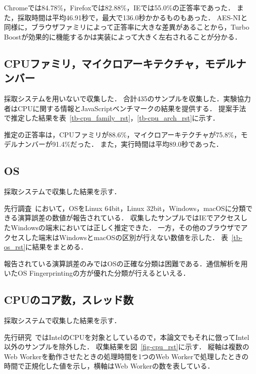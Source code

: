 Chromeでは84.78\%，Firefoxでは82.88\%，IEでは55.0\%の正答率であった．
また，採取時間は平均46.91秒で，最大で136.0秒かかるものもあった．
AES-NIと同様に，ブラウザファミリによって正答率に大きな差異があることから，Turbo Boostが効果的に機能するかは実装によって大きく左右されることが分かる．

\subsection{CPUファミリ，マイクロアーキテクチャ，モデルナンバー}
採取システムを用いないで収集した．
合計435のサンプルを収集した．実験協力者はCPUに関する情報とJavaScriptベンチマークの結果を提供する．
提案手法で推定した結果を表~\ref{tb-cpu_family_rst}，\ref{tb-cpu_arch_rst}に示す．





推定の正答率は，CPUファミリが88.6\%，マイクロアーキテクチャが75.8\%，モデルナンバーが91.4\%だった．
また，実行時間は平均89.0秒であった．

\subsection{OS}
採取システムで収集した結果を示す．

先行調査~\cite{tor_mathtan}において，OSをLinux 64bit，Linux 32bit，Windows，macOSに分類できる演算誤差の数値が報告されている．
収集したサンプルではIEでアクセスしたWindowsの端末においては正しく推定できた．
一方，その他のブラウザでアクセスした端末はWindowsとmacOSの区別が行えない数値を示した．
表~\ref{tb-os_rst}に結果をまとめる．



報告されている演算誤差のみではOSの正確な分類は困難である．通信解析を用いたOS Fingerprintingの方が優れた分類が行えるといえる．

\subsection{CPUのコア数，スレッド数}
採取システムで収集した結果を示す．

先行研究~\cite{後藤浩行2013web,桐生直輝2014web}ではIntelのCPUを対象としているので，本論文でもそれに倣ってIntel以外のサンプルを除外した．
収集結果を図~\ref{fig-cpu_rst}に示す．
縦軸は複数のWeb Workerを動作させたときの処理時間を1つのWeb Workerで処理したときの時間で正規化した値を示し，横軸はWeb Workerの数を表している．

